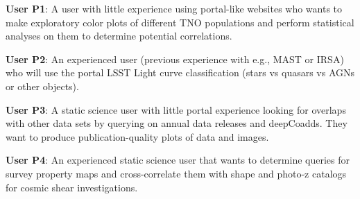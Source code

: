{\textbf{User P1}}: A user with little experience using portal-like websites who wants to make exploratory color plots of different TNO populations and perform statistical analyses on them to determine potential correlations. 

{\textbf{User P2}}: An experienced user (previous experience with e.g., MAST or IRSA) who will use the portal  LSST Light curve classification (stars vs quasars vs AGNs or other objects). 

{\textbf{User P3}}: A static science user with little portal experience looking for overlaps with other data sets by querying on annual data releases and deepCoadds. They want to produce publication-quality plots of data and images. 

{\textbf{User P4}}: An experienced static science user that wants to determine queries for survey property maps and cross-correlate them with shape and photo-z catalogs for cosmic shear investigations. 

